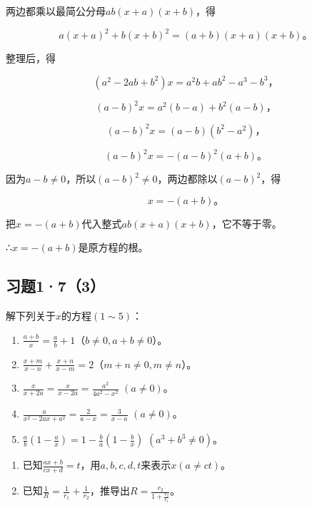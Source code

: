  两边都乘以最简公分母\(ab(x + a)(x + b)\)，得

\[
a (x + a) ^ {2} + b (x + b) ^ {2} = (a + b) (x + a) (x + b)\text{。}
\]

整理后，得

\[
(a ^ {2} - 2 a b + b ^ {2}) x = a ^ {2} b + a b ^ {2} - a ^ {3} - b ^ {3}\text{，}
\]

\[
(a - b) ^ {2} x = a ^ {2} (b - a) + b ^ {2} (a - b)\text{，}
\]

\[
(a - b) ^ {2} x = (a - b) (b ^ {2} - a ^ {2})\text{，}
\]

\[
(a - b) ^ {2} x = - (a - b) ^ {2} (a + b)\text{。}
\]

因为\(a - b \neq 0\)，所以\((a - b)^2 \neq 0\)，两边都除以\((a - b)^2\)，得

\[
x = - (a + b)\text{。}
\]

把\(x = -(a + b)\)代入整式\(ab(x + a)(x + b)\)，它不等于零。

∴\(x = -(a + b)\)是原方程的根。

\subsection{习题1·7（3）}

解下列关于\(x\)的方程\((1 \sim 5)\)：

\begin{enumerate}[start=1]
\item
  \(\frac{a + b}{x} = \frac{a}{b} + 1\)（\(b \neq 0, a + b \neq 0\)）。
\item
  \(\frac{x + m}{x - n} + \frac{x + n}{x - m} = 2\)（\(m + n \neq 0, m \neq n\)）。
\item
  \(\frac{x}{x + 2a} = \frac{x}{x - 2a} = \frac{a^2}{4a^2 - x^2}\) \((a \neq 0)\)。
\item
  \(\frac{a}{x^2 - 2ax + a^2} = \frac{2}{a - x} = \frac{3}{x - a}\) \((a \neq 0)\)。
\item
  \(\frac{a}{b}\left(1 - \frac{a}{x}\right) = 1 - \frac{b}{a}\left(1 - \frac{b}{x}\right)\) \((a^3 + b^3 \neq 0)\)。
\end{enumerate}

\begin{enumerate}[start=6]
\item
  已知\(\frac{ax + b}{cx + d} = t\)，用\(a, b, c, d, t\)来表示\(x (a \neq ct)\)。
\item
  已知\(\frac{1}{R} = \frac{1}{r_1} + \frac{1}{r_2}\)，推导出\(R = \frac{r_2}{1 + \frac{r_2}{r_1}}\)。
\end{enumerate}


